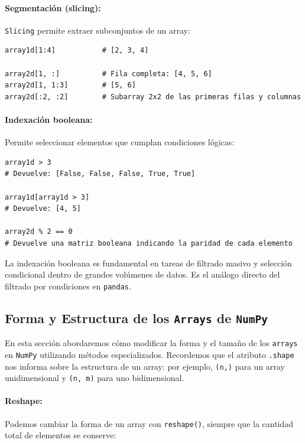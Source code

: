 \documentclass{article}
\theoremstyle{nonumberplain}
\begin{document}
\paragraph{Segmentación (slicing):}

\texttt{Slicing} permite extraer subconjuntos de un array:

\begin{verbatim}
array1d[1:4]           # [2, 3, 4]

array2d[1, :]          # Fila completa: [4, 5, 6]
array2d[1, 1:3]        # [5, 6]
array2d[:2, :2]        # Subarray 2x2 de las primeras filas y columnas
\end{verbatim}

\paragraph{Indexación booleana:}

Permite seleccionar elementos que cumplan condiciones lógicas:

\begin{verbatim}
array1d > 3
# Devuelve: [False, False, False, True, True]

array1d[array1d > 3]
# Devuelve: [4, 5]

array2d % 2 == 0
# Devuelve una matriz booleana indicando la paridad de cada elemento
\end{verbatim}

La indexación booleana es fundamental en tareas de filtrado masivo y selección condicional dentro de grandes volúmenes de datos. Es el análogo directo del filtrado por condiciones en \texttt{pandas}.

\subsection*{Forma y Estructura de los \texttt{Arrays} de \texttt{NumPy}}

En esta sección abordaremos cómo modificar la forma y el tamaño de los \texttt{arrays} en \texttt{NumPy} utilizando métodos especializados. Recordemos que el atributo \texttt{.shape} nos informa sobre la estructura de un array: por ejemplo, \texttt{(n,)} para un array unidimensional y \texttt{(n, m)} para uno bidimensional.

\paragraph{Reshape:}

Podemos cambiar la forma de un array con \texttt{reshape()}, siempre que la cantidad total de elementos se conserve:
\end{document}
